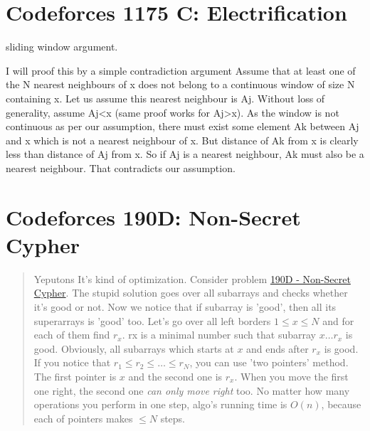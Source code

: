 \documentclass[14pt]{report}
\begin{document}
\section{Codeforces  1175 C: Electrification}

sliding window argument.

I will proof this by a simple contradiction argument Assume that at least one of the N nearest neighbours of x does not belong to a continuous window of size N containing x. Let us assume this nearest neighbour is Aj. Without loss of generality, assume Aj<x (same proof works for Aj>x). As the window is not continuous as per our assumption, there must exist some element Ak between Aj and x which is not a nearest neighbour of x. But distance of Ak from x is clearly less than distance of Aj from x. So if Aj is a nearest neighbour, Ak must also be a nearest neighbour. That contradicts our assumption.




\section{Codeforces 190D: Non-Secret Cypher}

\begin{quote}{Yeputons}
It's kind of optimization. Consider problem \href{https://codeforces.com/contest/190/problem/D}{190D - Non-Secret Cypher}. The
stupid solution goes over all subarrays and checks whether it's good or
not. Now we notice that if subarray is 'good', then all its superarrays is
'good' too. Let's go over all left borders $1 \leq x \leq N$
and for each of them find $r_x$. rx is a minimal number such that subarray
$x \dots  r_x$ is good.  Obviously, all subarrays which starts at $x$ and
ends after $r_x$ is good.  If you notice that $r_1 \leq r_2 \leq \dots \leq r_N$,
you can use 'two pointers' method. The first pointer is $x$ and the second one
is $r_x$. When you move the first one right, the second one
\emph{can only move right} too. No matter how many operations you perform in one step,
algo's running time is $O(n)$, because each of pointers makes $\leq N$
steps.
\end{quote}
\end{document}
